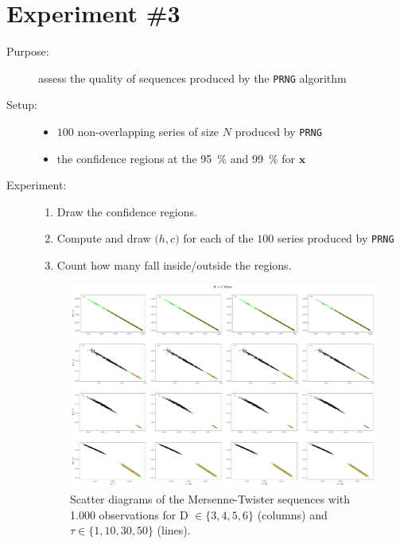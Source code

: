 \documentclass[12pt]{article}
\begin{document}
\newpage

\section{Experiment \#3}

\begin{description}
	\item[Purpose:] assess the quality of sequences produced by the \texttt{PRNG} algorithm
	\item[Setup:]\mbox{} 
	\begin{itemize}
		\item $100$ non-overlapping series of size $N$ produced by \texttt{PRNG}
		\item the confidence regions at the \SI{95}{\percent} and \SI{99}{\percent} for $\bm x$
	\end{itemize}
	\item[Experiment:] \mbox{}
	\begin{enumerate}
		\item Draw the confidence regions.
		\item Compute and draw $\big(h,c\big)$ for each of the $100$ series produced by \texttt{PRNG}
		\item Count how many fall inside/outside the regions.
	\end{enumerate}
	
	\begin{figure}[H]
	\includegraphics[width=\linewidth]{../../Images/PRNGs/N1000/Mersenne-1000.pdf}
	\caption{Scatter diagrams of the Mersenne-Twister sequences with 1.000 observations for D $\in \{3,4,5,6\}$ (columns) and $\tau \in \{1,10,30,50\}$ (lines).}
	\end{figure}


\end{description}
\end{document}
